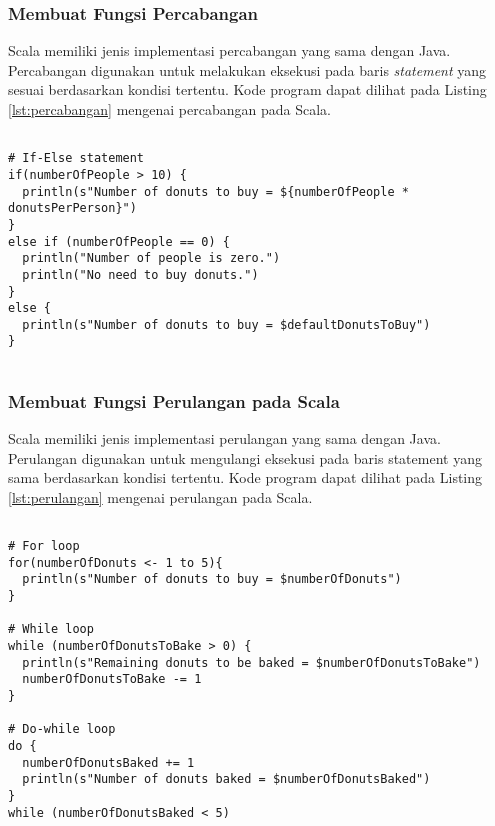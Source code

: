 \subsubsection{Membuat Fungsi Percabangan}
Scala memiliki jenis implementasi percabangan yang sama dengan Java. Percabangan digunakan untuk melakukan eksekusi pada baris \textit{statement} yang sesuai berdasarkan kondisi tertentu. Kode program dapat dilihat pada Listing \ref{lst:percabangan} mengenai percabangan pada Scala.

\begin{lstlisting}[basicstyle=\ttfamily, frame=single,
	columns=fullflexible, keepspaces=true, breaklines=true, label=lst:percabangan, caption=Membuat Fungsi Percabangan pada Scala]

# If-Else statement
if(numberOfPeople > 10) { 
  println(s"Number of donuts to buy = ${numberOfPeople * donutsPerPerson}")
}
else if (numberOfPeople == 0) {
  println("Number of people is zero.")
  println("No need to buy donuts.")
} 
else {
  println(s"Number of donuts to buy = $defaultDonutsToBuy")
}
	
\end{lstlisting}

\subsubsection{Membuat Fungsi Perulangan pada Scala}
Scala memiliki jenis implementasi perulangan yang sama dengan Java. Perulangan digunakan untuk mengulangi eksekusi pada baris statement yang sama berdasarkan kondisi tertentu. Kode program dapat dilihat pada Listing \ref{lst:perulangan} mengenai perulangan pada Scala.

\begin{lstlisting}[basicstyle=\ttfamily, frame=single,
	columns=fullflexible, keepspaces=true, breaklines=true, label=lst:perulangan, caption=Membuat Fungsi Perulangan pada Scala]
	
# For loop
for(numberOfDonuts <- 1 to 5){
  println(s"Number of donuts to buy = $numberOfDonuts")
}

# While loop
while (numberOfDonutsToBake > 0) {
  println(s"Remaining donuts to be baked = $numberOfDonutsToBake")
  numberOfDonutsToBake -= 1
}

# Do-while loop
do {
  numberOfDonutsBaked += 1
  println(s"Number of donuts baked = $numberOfDonutsBaked")
} 
while (numberOfDonutsBaked < 5)

\end{lstlisting}



